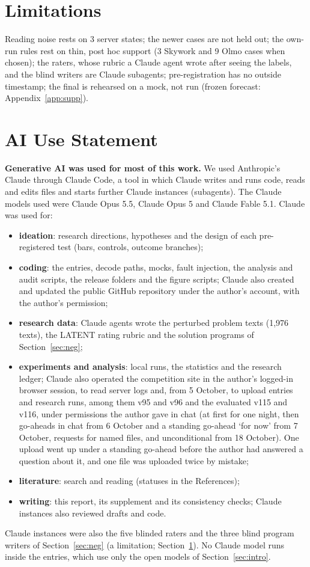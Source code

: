 \documentclass{article}
\begin{document}
\section{Limitations}
\label{sec:limits}

Reading noise rests on 3 server states; the newer cases are not held out; the own-run rules rest on thin, post hoc
support (3 Skywork and 9 Olmo cases when chosen); the raters, whose rubric a Claude agent wrote after seeing the labels,
and the blind writers are Claude subagents; pre-registration has no outside timestamp; the final is rehearsed on a mock,
not run (frozen forecast: Appendix~\ref{app:supp}).

\section*{AI Use Statement}

\textbf{Generative AI was used for most of this work.} We used Anthropic's Claude through Claude Code, a tool in which
Claude writes and runs code, reads and edits files and starts further Claude instances (subagents). The Claude models used were Claude Opus 5.5, Claude Opus 5 and Claude Fable 5.1. Claude was used for:
\begin{itemize}
\item \textbf{ideation}: research directions, hypotheses and the design of each pre-registered test (bars, controls,
  outcome branches);
\item \textbf{coding}: the entries, decode paths, mocks, fault injection, the analysis and audit scripts, the release
  folders and the figure scripts; Claude also created and updated the public GitHub repository under the author's
  account, with the author's permission;
\item \textbf{research data}: Claude agents wrote the perturbed problem texts (1,976 texts), the LATENT rating rubric
  and the solution programs of Section~\ref{sec:neg};
\item \textbf{experiments and analysis}: local runs, the statistics and the research ledger; Claude also operated the
  competition site in the author's logged-in browser session, to read server logs and, from 5 October, to upload
  entries and research runs, among them v95 and v96 and the evaluated v115 and v116, under permissions the author gave
  in chat (at first for one night, then go-aheads in chat from 6 October and a standing go-ahead `for now' from 7 October,
  requests for named files, and unconditional from 18 October). One upload went
  up under a standing go-ahead before the author had answered a question about it, and one file was uploaded twice by
  mistake;
\item \textbf{literature}: search and reading (statuses in the References);
\item \textbf{writing}: this report, its supplement and its consistency checks; Claude instances also reviewed drafts
  and code.
\end{itemize}
Claude instances were also the five blinded raters and the three blind program writers of Section~\ref{sec:neg} (a
limitation; Section~\ref{sec:limits}). No Claude model runs inside the entries, which use only the open models of
Section~\ref{sec:intro}.
\end{document}
